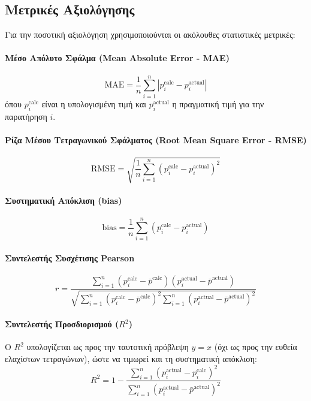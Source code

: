 \subsection{Μετρικές Αξιολόγησης}
\label{subsec:evaluation-metrics}

Για την ποσοτική αξιολόγηση χρησιμοποιούνται οι ακόλουθες στατιστικές μετρικές:

\paragraph{Μέσο Απόλυτο Σφάλμα (Mean Absolute Error - MAE)}
\begin{equation}
\text{MAE} = \frac{1}{n} \sum_{i=1}^{n} |p_i^{\text{calc}} - p_i^{\text{actual}}|
\label{eq:mae}
\end{equation}
όπου $p_i^{\text{calc}}$ είναι η υπολογισμένη τιμή και $p_i^{\text{actual}}$ η πραγματική τιμή για την παρατήρηση $i$.

\paragraph{Ρίζα Μέσου Τετραγωνικού Σφάλματος (Root Mean Square Error - RMSE)}
\begin{equation}
\text{RMSE} = \sqrt{\frac{1}{n} \sum_{i=1}^{n} (p_i^{\text{calc}} - p_i^{\text{actual}})^2}
\label{eq:rmse}
\end{equation}

\paragraph{Συστηματική Απόκλιση (bias)}
\begin{equation}
\text{bias} = \frac{1}{n} \sum_{i=1}^{n} (p_i^{\text{calc}} - p_i^{\text{actual}})
\label{eq:bias}
\end{equation}

\paragraph{Συντελεστής Συσχέτισης Pearson}
\begin{equation}
r = \frac{\sum_{i=1}^{n}(p_i^{\text{calc}} - \bar{p}^{\text{calc}})(p_i^{\text{actual}} - \bar{p}^{\text{actual}})}{\sqrt{\sum_{i=1}^{n}(p_i^{\text{calc}} - \bar{p}^{\text{calc}})^2 \sum_{i=1}^{n}(p_i^{\text{actual}} - \bar{p}^{\text{actual}})^2}}
\label{eq:pearson}
\end{equation}

\paragraph{Συντελεστής Προσδιορισμού ($R^2$)}
Ο $R^2$ υπολογίζεται ως προς την ταυτοτική πρόβλεψη $y=x$ (όχι ως προς την ευθεία ελαχίστων τετραγώνων), ώστε να τιμωρεί και τη συστηματική απόκλιση:
\begin{equation}
R^2 = 1 - \frac{\sum_{i=1}^{n}(p_i^{\text{actual}} - p_i^{\text{calc}})^2}{\sum_{i=1}^{n}(p_i^{\text{actual}} - \bar{p}^{\text{actual}})^2}
\label{eq:r-squared}
\end{equation}

